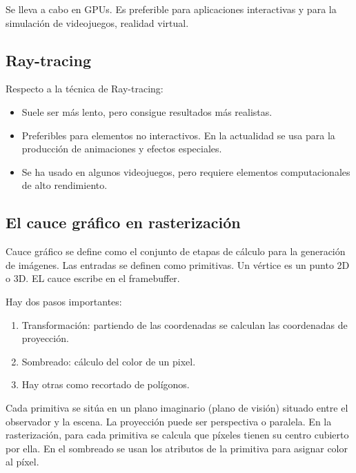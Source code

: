 \documentclass[12pt]{book} %
\providecommand{\tightlist}{%
  \setlength{\itemsep}{0pt}\setlength{\parskip}{0pt}}
\begin{document}
Se lleva a cabo en GPUs. Es preferible para aplicaciones interactivas y
para la simulación de videojuegos, realidad virtual.

\hypertarget{ray-tracing}{%
\subsection{Ray-tracing}\label{ray-tracing}}

Respecto a la técnica de Ray-tracing:

\begin{itemize}
\tightlist
\item
  Suele ser más lento, pero consigue resultados más realistas.\\
\item
  Preferibles para elementos no interactivos. En la actualidad se usa
  para la producción de animaciones y efectos especiales.\\
\item
  Se ha usado en algunos videojuegos, pero requiere elementos
  computacionales de alto rendimiento.
\end{itemize}

\hypertarget{el-cauce-gruxe1fico-en-rasterizaciuxf3n}{%
\subsection{El cauce gráfico en
rasterización}\label{el-cauce-gruxe1fico-en-rasterizaciuxf3n}}

Cauce gráfico se define como el conjunto de etapas de cálculo para la
generación de imágenes. Las entradas se definen como primitivas. Un
vértice es un punto 2D o 3D. EL cauce escribe en el framebuffer.

Hay dos pasos importantes:

\begin{enumerate}
\def\labelenumi{\arabic{enumi}.}
\tightlist
\item
  Transformación: partiendo de las coordenadas se calculan las
  coordenadas de proyección.\\
\item
  Sombreado: cálculo del color de un pixel.\\
\item
  Hay otras como recortado de polígonos.
\end{enumerate}

Cada primitiva se sitúa en un plano imaginario (plano de visión) situado
entre el observador y la escena. La proyección puede ser perspectiva o
paralela. En la rasterización, para cada primitiva se calcula que
píxeles tienen su centro cubierto por ella. En el sombreado se usan los
atributos de la primitiva para asignar color al píxel.
\end{document}
